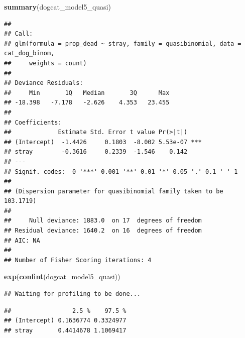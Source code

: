 \documentclass[]{article}
\newenvironment{Shaded}{\begin{snugshade}}{\end{snugshade}}
\newcommand{\KeywordTok}[1]{\textcolor[rgb]{0.13,0.29,0.53}{\textbf{#1}}}
\newcommand{\NormalTok}[1]{#1}
\begin{document}
\begin{Shaded}
\begin{Highlighting}[]
\KeywordTok{summary}\NormalTok{(dogcat_model5_quasi)}
\end{Highlighting}
\end{Shaded}

\begin{verbatim}
## 
## Call:
## glm(formula = prop_dead ~ stray, family = quasibinomial, data = cat_dog_binom, 
##     weights = count)
## 
## Deviance Residuals: 
##     Min       1Q   Median       3Q      Max  
## -18.398   -7.178   -2.626    4.353   23.455  
## 
## Coefficients:
##             Estimate Std. Error t value Pr(>|t|)    
## (Intercept)  -1.4426     0.1803  -8.002 5.53e-07 ***
## stray        -0.3616     0.2339  -1.546    0.142    
## ---
## Signif. codes:  0 '***' 0.001 '**' 0.01 '*' 0.05 '.' 0.1 ' ' 1
## 
## (Dispersion parameter for quasibinomial family taken to be 103.1719)
## 
##     Null deviance: 1883.0  on 17  degrees of freedom
## Residual deviance: 1640.2  on 16  degrees of freedom
## AIC: NA
## 
## Number of Fisher Scoring iterations: 4
\end{verbatim}

\begin{Shaded}
\begin{Highlighting}[]
\KeywordTok{exp}\NormalTok{(}\KeywordTok{confint}\NormalTok{(dogcat_model5_quasi))}
\end{Highlighting}
\end{Shaded}

\begin{verbatim}
## Waiting for profiling to be done...
\end{verbatim}

\begin{verbatim}
##                 2.5 %    97.5 %
## (Intercept) 0.1636774 0.3324977
## stray       0.4414678 1.1069417
\end{verbatim}
\end{document}
